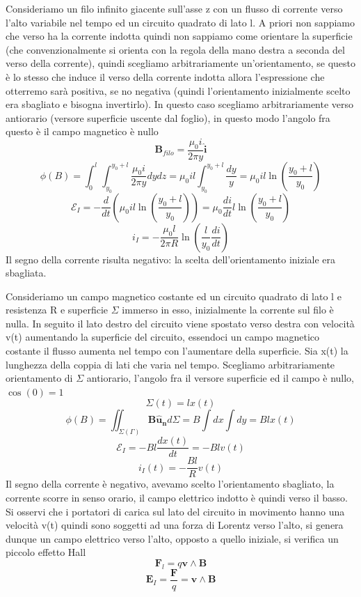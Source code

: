 \documentclass[
10pt, %
a4paper, %
oneside, %
headinclude,footinclude, %
BCOR5mm, %
]{scrartcl}
\begin{document}
\begin{esercizio}
Consideriamo un filo infinito giacente sull'asse z con un flusso di corrente verso l'alto variabile nel tempo ed un circuito quadrato di lato l. A priori non sappiamo che verso ha la corrente indotta quindi non sappiamo come orientare la superficie  (che convenzionalmente si orienta con la regola della mano destra a seconda del verso della corrente), quindi scegliamo arbitrariamente un'orientamento, se questo è lo stesso che induce il verso della corrente indotta allora l'espressione che otterremo sarà positiva, se no negativa (quindi l'orientamento inizialmente scelto era sbagliato e bisogna invertirlo). In questo caso scegliamo arbitrariamente verso antiorario (versore superficie uscente dal foglio), in questo modo l'angolo fra questo è il campo magnetico è nullo
\[\mathbf{B}_{filo} = \frac{\mu_0 i}{2\pi y}\mathbf{\hat{i}}\]
\[\phi(B)=\int_0^l\int_{y_0}^{y_0+l} \frac{\mu_0 i}{2\pi y}dydz= \mu_0 i l \int_{y_0}^{y_0+l}\frac{dy}{y}=\mu_0 i l \ln\left(\frac{y_0 + l}{y_0}\right)\]
\[\mathcal{E}_I=-\frac{d}{dt}\left(\mu_0 i l \ln\left(\frac{y_0 + l}{y_0}\right)\right) = \mu_0 \frac{di}{dt} l \ln\left(\frac{y_0 + l}{y_0}\right)\]
\[i_I = -\frac{\mu_0 l}{2\pi R}\ln\left(\frac{l}{y_0}\frac{di}{dt}\right)\]
Il segno della corrente risulta negativo: la scelta dell'orientamento iniziale era sbagliata. 
\end{esercizio}
\begin{esercizio}
Consideriamo un campo magnetico costante ed un circuito quadrato di lato l e resistenza R e superficie $\Sigma$ immerso in esso, inizialmente la corrente sul filo è nulla. In seguito il lato destro del circuito viene spostato verso destra con velocità v(t) aumentando la superficie del circuito, essendoci un campo magnetico costante il flusso aumenta nel tempo con l'aumentare della superficie. Sia x(t) la lunghezza della coppia di lati che varia nel tempo. Scegliamo arbitrariamente orientamento di \(\Sigma\) antiorario, l'angolo fra il versore superficie ed il campo è nullo, \(\cos(0)= 1\)
\[\Sigma(t) = l x(t)\] 
\[\phi(B) = \iint_{\Sigma(\Gamma)}\mathbf{B}\mathbf{\hat{u}_n}d\Sigma = B\int dx\int dy = Blx(t)\]
\[\mathcal{E}_I = -Bl\frac{dx(t)}{dt} = -Blv(t)\]
\[i_I(t) = -\frac{Bl}{R}v(t)\]
Il segno della corrente è negativo, avevamo scelto l'orientamento sbagliato, la corrente scorre in senso orario, il campo elettrico indotto è quindi verso il basso.\\
Si osservi che i portatori di carica sul lato del circuito in movimento hanno una velocità v(t) quindi sono soggetti ad una forza di Lorentz verso l'alto, si genera dunque un campo elettrico verso l'alto, opposto a quello iniziale, si verifica un piccolo effetto Hall
\[\mathbf{F}_l = q \mathbf{v}\wedge\mathbf{B}\]
\[\mathbf{E}_I=\frac{\mathbf{F}}{q} = \mathbf{v}\wedge\mathbf{B}\]
\end{esercizio}
\end{document}
